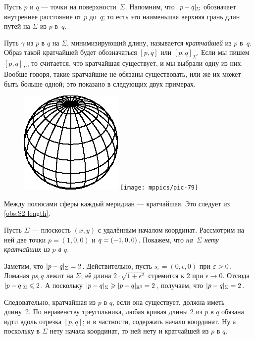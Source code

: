 Пусть $p$ и $q$ --- точки на поверхности~$\Sigma$.
Напомним, что $\dist{p}{q}\Sigma$ обозначает внутреннее расстояние от $p$ до~$q$;
то есть это наименьшая верхняя грань длин путей на $\Sigma$ из $p$ в~$q$.

Путь $\gamma$ из $p$ в $q$ на $\Sigma$, минимизирующий длину, называется \emph{кратчайшей} из $p$ в~$q$.
Образ такой кратчайшей будет обозначаться $[p,q]$ или $[p,q]_\Sigma$.
Если мы пишем $[p,q]_\Sigma$, то считается, что кратчайшая существует, и мы выбрали одну из них.
Вообще говоря, такие кратчайшие не обязаны существовать, или же их может быть больше одной;
это показано в следующих двух примерах.

\begin{figure}
\vskip-6mm
\centering
\includegraphics{asy/sphere}
\bigskip
\texttt{[image: mppics/pic-79]}
\end{figure}

Между полюсами сферы каждый меридиан --- кратчайшая.
Это следует из \ref{obs:S2-length}.

 Пусть $\Sigma$ --- плоскость $(x,y)$ с удалённым началом координат.
Рассмотрим на ней две точки $p=(1,0,0)$ и $q\z=(-1,0,0)$.
Покажем, что \textit{на~$\Sigma$ нету кратчайших из $p$ в $q$.}

Заметим, что $\dist{p}{q}\Sigma=2$. 
Действительно, пусть $s_\epsilon=(0,\epsilon,0)$ при $\epsilon\z>0$.
Ломаная $ps_\epsilon q$ лежит на $\Sigma$;
её длина $2\cdot\sqrt{1+\epsilon^2}$ стремится к 2 при $\epsilon\to0$.
Отсюда $\dist{p}{q}\Sigma\le 2$.
А поскольку $\dist{p}{q}\Sigma\z\ge \dist{p}{q}{\mathbb{R}^3}=2$, получаем, что $\dist{p}{q}\Sigma=2$.

Следовательно, кратчайшая из $p$ в $q$, если она существует, должна иметь длину~2.
По неравенству треугольника, любая кривая длины 2 из $p$ в $q$ обязана идти вдоль отрезка $[p,q]$;
и в частности, содержать начало координат.
Ну а поскольку в $\Sigma$ нету начала координат, то ней нету и кратчайшей из $p$ в $q$. 

